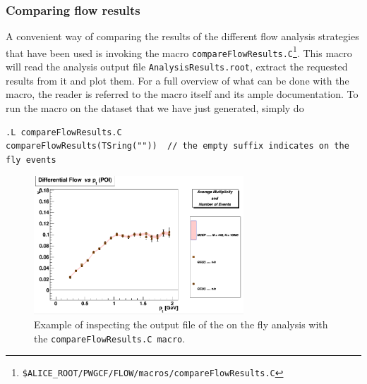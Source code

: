 \documentclass[a4paper]{book}
\numberwithin{equation}{subsection}
\begin{document}
\subsubsection{Comparing flow results}
A convenient way of comparing the results of the different flow analysis strategies that have been used is invoking the macro \texttt{compareFlowResults.C}\footnote{\texttt{\$ALICE\_ROOT/PWGCF/FLOW/macros/compareFlowResults.C}}.  This macro will read the analysis output file \texttt{AnalysisResults.root}, extract the requested results from it and plot them. For a full overview of what can be done with the macro, the reader is referred to the macro itself and its ample documentation. To run the macro on the dataset that we have just generated, simply do
\begin{lstlisting}
.L compareFlowResults.C
compareFlowResults(TSring(""))	// the empty suffix indicates on the fly events \end{lstlisting}

\begin{figure}
 \includegraphics[width=0.70\textwidth]{figs/compareFlowResults.png}
 \caption[Comparing on the fly flow results]{Example of inspecting the output file of the on the fly analysis with the \texttt{compareFlowResults.C macro}.}
 \label{fig:browserExample}
\end{figure}
\end{document}
